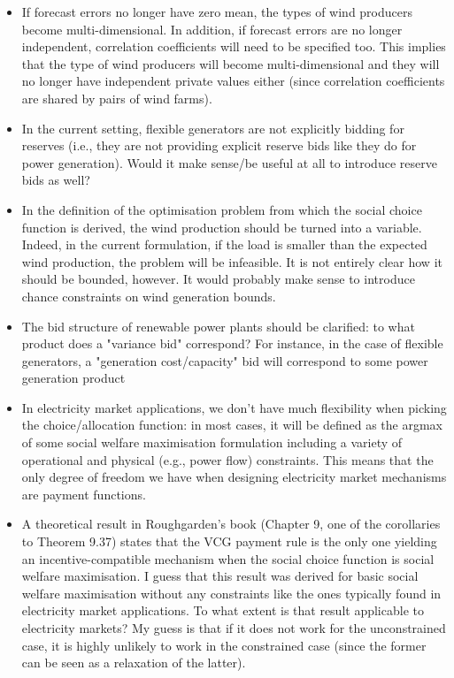 \documentclass{article}
\begin{document}
\begin{itemize}
\item If forecast errors no longer have zero mean, the types of wind producers become multi-dimensional. In addition, if forecast errors are no longer independent, correlation coefficients will need to be specified too. This implies that the type of wind producers will become multi-dimensional and they will no longer have independent private values either (since correlation coefficients are shared by pairs of wind farms).
\item In the current setting, flexible generators are not explicitly bidding for reserves (i.e., they are not providing explicit reserve bids like they do for power generation). Would it make sense/be useful at all to introduce reserve bids as well?
\item In the definition of the optimisation problem from which the social choice function is derived, the wind production should be turned into a variable. Indeed, in the current formulation, if the load is smaller than the expected wind production, the problem will be infeasible. It is not entirely clear how it should be bounded, however. It would probably make sense to introduce chance constraints on wind generation bounds. 
\item The bid structure of renewable power plants should be clarified: to what product does a "variance bid" correspond? For instance, in the case of flexible generators, a "generation cost/capacity" bid will correspond to some power generation product 
\item In electricity market applications, we don't have much flexibility when picking the choice/allocation function: in most cases, it will be defined as the argmax of some social welfare maximisation formulation including a variety of operational and physical (e.g., power flow) constraints. This means that the only degree of freedom we have when designing electricity market mechanisms are payment functions. 
\item A theoretical result in Roughgarden's book (Chapter 9, one of the corollaries to Theorem 9.37) states that the VCG payment rule is the only one yielding an incentive-compatible mechanism when the social choice function is social welfare maximisation. I guess that this result was derived for basic social welfare maximisation without any constraints like the ones typically found in electricity market applications. To what extent is that result applicable to electricity markets? My guess is that if it does not work for the unconstrained case, it is highly unlikely to work in the constrained case (since the former can be seen as a relaxation of the latter).

\end{itemize}
\end{document}
